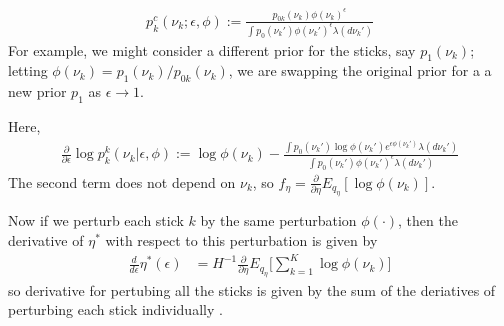 \documentclass[a4paper]{article}
\begin{document}
\begin{align}
	\label{eq:expon_perturb}
	p^c_{k}(\nu_k ; \epsilon, \phi) :=
  \frac{p_{0k}(\nu_k)\phi(\nu_k)^\epsilon}{\int p_0(\nu_k')\phi(\nu_k')^\epsilon \lambda(d\nu_k')}
\end{align}
For example, we might consider a different prior for the sticks, say $p_1(\nu_k)$;
letting $\phi(\nu_k) = p_1(\nu_k) / p_{0k}(\nu_k)$,
we are swapping the original prior for a a new prior $p_1$ as $\epsilon \rightarrow 1$.

Here,
\begin{align}
  \frac{\partial}{\partial \epsilon} \log p_k^k(\nu_k | \epsilon, \phi) := \log \phi(\nu_k) -
    \frac{\int p_0(\nu_k')\log\phi(\nu_k')e^{\epsilon\phi(\nu_k')} \lambda(d\nu_k')}{\int p_0(\nu_k')\phi(\nu_k')^\epsilon \lambda(d\nu_k')}
\end{align}
The second term does not depend on $\nu_k$, so $f_\eta = \frac{\partial}{\partial \eta} E_{q_\eta}[\log \phi(\nu_k)]$.

Now if we perturb each stick $k$ by the same perturbation $\phi(\cdot)$, then
the derivative of $\eta^*$ with respect to this perturbation is given by
\begin{align}
   \frac{d}{d\epsilon}\eta^*(\epsilon) &=
   H^{-1}\frac{\partial}{\partial \eta} E_{q_\eta}\Big[\sum_{k = 1}^K \log \phi(\nu_k)\Big]
  \label{eq:sensitivity_exp_pert}
\end{align}
so derivative for pertubing all the sticks is given by the sum of the deriatives
of perturbing each stick individually \cite{gustafson:2012:localrobustnessbook}.
\end{document}
